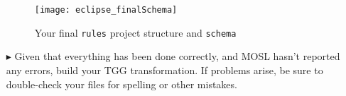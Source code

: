 \begin{itemize}
\vspace{0.5cm}

\begin{figure}[htbp]
\begin{center}
  \texttt{[image: eclipse\_finalSchema]}
  \caption{Your final \texttt{rules} project structure and \texttt{schema}}
  \label{eclipse:schemaFinal}
\end{center}
\end{figure}

\vspace{0.5cm}

\item[$\blacktriangleright$] Given that everything has been done correctly, and MOSL hasn't reported any errors, build your TGG transformation. If problems
arise, be sure to double-check your files for spelling or other mistakes.

\end{itemize}
